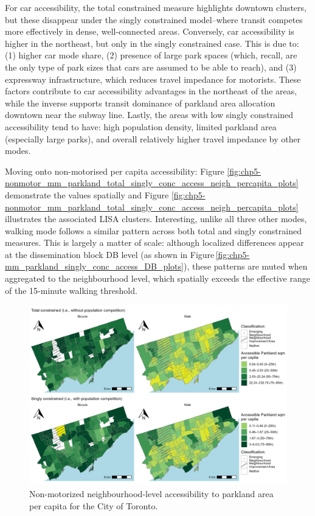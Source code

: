 \documentclass[
11pt, %
oneside, %
english, %
singlespacing, %
]{macthesis} %
\begin{document}
For car accessibility, the total constrained measure highlights downtown clusters, but these disappear under the singly constrained model--where transit competes more effectively in dense, well-connected areas. Conversely, car accessibility is higher in the northeast, but only in the singly constrained case. This is due to: (1) higher car mode share, (2) presence of large park spaces (which, recall, are the only type of park sizes that cars are assumed to be able to reach), and (3) expressway infrastructure, which reduces travel impedance for motorists. These factors contribute to car accessibility advantages in the northeast of the areas, while the inverse supports transit dominance of parkland area allocation downtown near the subway line. Lastly, the areas with low singly constrained accessibility tend to have: high population density, limited parkland area (especially large parks), and overall relatively higher travel impedance by other modes.

Moving onto non-motorised per capita accessibility: Figure \ref{fig:chp5-nonmotor_mm_parkland_total_singly_conc_access_neigh_percapita_plots} demonstrate the values spatially and Figure \ref{fig:chp5-nonmotor_mm_parkland_total_singly_conc_access_neigh_percapita_plots} illustrates the associated LISA clusters. Interesting, unlike all three other modes, walking mode follows a similar pattern across both total and singly constrained measures. This is largely a matter of scale: although localized differences appear at the dissemination block DB level (as shown in Figure\,\ref{fig:chp5-mm_parkland_singly_conc_access_DB_plots}), these patterns are muted when aggregated to the neighbourhood level, which spatially exceeds the effective range of the 15-minute walking threshold.

\begin{figure}

{\centering \includegraphics[width=6in]{./data/figures/chp5-nonmotor_mm_parkland_total_singly_conc_access_neigh_percapita_plots} 

}

\caption{\label{fig:chp5-nonmotor_mm_parkland_total_singly_conc_access_neigh_percapita_plots} Non-motorized neighbourhood-level accessibility to parkland area per capita for the City of Toronto.}\label{fig:unnamed-chunk-84}
\end{figure}
\end{document}
